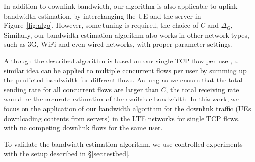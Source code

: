 
In addition to downlink bandwidth, our algorithm is also applicable to uplink bandwidth estimation, by interchanging the UE and the server in Figure~\ref{fig:algo}. However, some tuning is required, \eg the choice of $C$ and $\Delta_{G}$, \etc Similarly, our bandwidth estimation algorithm also works in other network types, such as 3G, WiFi and even wired networks, with proper parameter settings.

Although the described algorithm is based on one single TCP flow per user, a similar idea can be applied to multiple concurrent flows per user by summing up the predicted bandwidth for different flows. As long as we ensure that the total sending rate for all concurrent flows are larger than $C$, the total receiving rate would be the accurate estimation of the available bandwidth. In this work, we focus on the application of our bandwidth algorithm for the downlink traffic (UEs downloading contents from servers) in the LTE networks for single TCP flows, \ie with no competing downlink flows for the same user.


To validate the bandwidth estimation algorithm, we use controlled experiments with the setup described in \S\ref{sec:testbed}.

\begin{figure}[t]
\centering
{}\\
\label{fig:bw.time}
\end{figure}

\begin{figure}[t]
\centering
{}\\
\label{fig:bw.cdf}
\end{figure}

